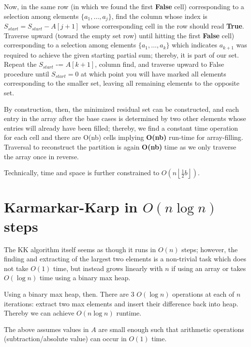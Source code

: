 \documentclass[conference]{styles/acmsiggraph}
\newcommand{\?}{\stackrel{?}{=}}
\DeclareRobustCommand{\mybox}[2][gray!20]{%
\begin{tcolorbox}[   %
        breakable,
        left=0pt,
        right=0pt,
        top=0pt,
        bottom=0pt,
        colback=#1,
        colframe=#1,
        width=\dimexpr\textwidth\relax, 
        enlarge left by=0mm,
        boxsep=5pt,
        arc=0pt,outer arc=0pt,
        ]
        #2
\end{tcolorbox}
}
\begin{document}
Now, in the same row (in which we found the first \textbf{False} cell) corresponding to a selection among elements $\{a_1, \ldots, a_j\}$, find the column whose index is $S_{start} = S_{start} - A[j+1]$ whose corresponding cell in the row should read \textbf{True}.  Traverse upward (toward the empty set row) until hitting the first \textbf{False} cell) corresponding to a selection among elements $\{a_1, \ldots, a_k\}$ which indicates  $a_{k+1}$ was required to achieve the given starting partial sum; thereby, it is part of our set.  Repeat the $S_{start}$ -= $A[k+1]$, column find, and traverse upward to False procedure until $S_{start} = 0$ at which point you will have marked all elements corresponding to the smaller set, leaving all remaining elements to the opposite set.\\

\mybox{
By construction, then, the minimized residual set can be constructed, and each entry in the array after the base cases is determined by two other elements whose entries will already have been filled; thereby, we find a constant time operation for each cell and there are O(nb) cells implying \textbf{O(nb)} run-time for array-filling.  Traversal to reconstruct the partition is again \textbf{O(nb)} time as we only traverse the array once in reverse.}

Technically, time and space is further constrained to $O\left(n\left \lfloor \frac{1}{2}b \right \rfloor \right)$.

\newpage


\section{Karmarkar-Karp in $O(n \log n)$ steps}
The KK algorithm itself seems as though it runs in $O(n)$ steps; however, the finding and extracting of the largest two elements is a non-trivial task which does not take $O(1)$ time, but instead grows linearly with $n$ if using an array or takes $O(\log n)$ time using a binary max heap.\\

\mybox{
Using a binary max heap, then.  There are 3 $O(\log n)$ operations at each of $n$ iterations: extract two max elements and insert their difference back into heap.  Thereby we can achieve $O(n \log n)$ runtime.}

The above assumes values in $A$ are small enough such that arithmetic operations (subtraction/absolute value) can occur in $O(1)$ time.
\end{document}
